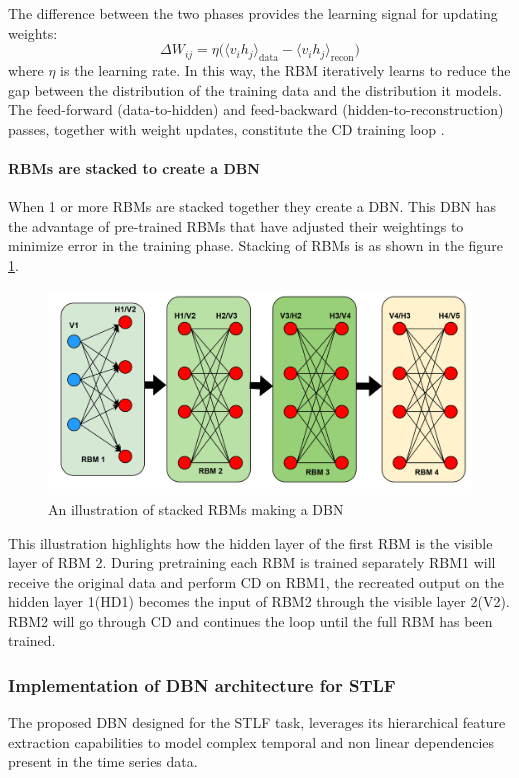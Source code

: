 The difference between the two phases provides the learning signal for updating weights:
\[
\Delta W_{ij} = \eta \Big( \langle v_i h_j \rangle_{\text{data}} - \langle v_i h_j \rangle_{\text{recon}} \Big)
\tag{14}
\label{eqn:14}
\]
where $\eta$ is the learning rate. In this way, the RBM iteratively learns to reduce the gap between the distribution of the training data and the distribution it models. The feed-forward (data-to-hidden) and feed-backward (hidden-to-reconstruction) passes, together with weight updates, constitute the CD training loop \cite{RBM_GeeksforGeeks}.

\paragraph{RBMs are stacked to create a DBN} When 1 or more RBMs are stacked together they create a DBN. This DBN has the advantage of pre-trained RBMs that have adjusted their weightings to minimize error in the training phase. Stacking of RBMs is as shown in the figure \ref{fig:correctrbm}.
\begin{figure}[h]
	\centering
	\includegraphics[width=0.7\linewidth]{Chapters/images/CORRECT_RBM}
	\caption{An illustration of stacked RBMs making a DBN}
	\label{fig:correctrbm}
\end{figure} 
This illustration highlights how the hidden layer of the first RBM is the visible layer of RBM 2. During pretraining each RBM is trained separately RBM1 will receive the original data and perform CD on RBM1, the recreated output on the hidden layer 1(HD1) becomes the input of RBM2 through the visible layer 2(V2). RBM2 will go through CD and continues the loop until the full RBM has been trained.

\subsubsection{Implementation of DBN architecture for STLF}
The proposed DBN designed for the STLF task, leverages its hierarchical feature extraction capabilities to model complex temporal and non linear dependencies present in the time series data.

